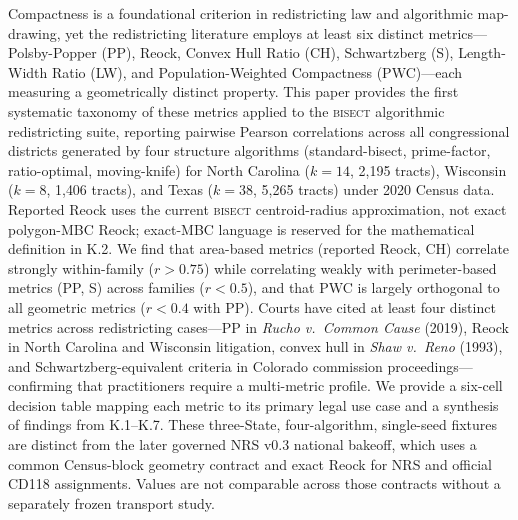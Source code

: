 Compactness is a foundational criterion in redistricting law and algorithmic map-drawing,
yet the redistricting literature employs at least six distinct metrics---Polsby-Popper (PP),
Reock, Convex Hull Ratio (CH), Schwartzberg (S), Length-Width Ratio (LW), and
Population-Weighted Compactness (PWC)---each measuring a geometrically distinct
property. This paper provides the first systematic taxonomy of these metrics
applied to the \textsc{bisect} algorithmic redistricting suite, reporting
pairwise Pearson correlations across all congressional districts generated by four
structure algorithms (standard-bisect, prime-factor, ratio-optimal, moving-knife)
for North Carolina ($k=14$, 2{,}195 tracts), Wisconsin ($k=8$, 1{,}406 tracts),
and Texas ($k=38$, 5{,}265 tracts) under 2020 Census data.
Reported Reock uses the current \textsc{bisect} centroid-radius approximation,
not exact polygon-MBC Reock; exact-MBC language is reserved for the mathematical
definition in K.2.
We find that area-based metrics (reported Reock, CH) correlate strongly within-family
($r > 0.75$) while correlating weakly with perimeter-based metrics (PP, S)
across families ($r < 0.5$), and that PWC is largely orthogonal to all
geometric metrics ($r < 0.4$ with PP).
Courts have cited at least four distinct metrics across redistricting cases---PP
in \textit{Rucho v.\ Common Cause} (2019), Reock in North Carolina and Wisconsin
litigation, convex hull in \textit{Shaw v.\ Reno} (1993), and Schwartzberg-equivalent
criteria in Colorado commission proceedings---confirming that practitioners
require a multi-metric profile.
We provide a six-cell decision table mapping each metric to its primary legal
use case and a synthesis of findings from K.1--K.7. These three-State,
four-algorithm, single-seed fixtures are distinct from the later governed NRS
v0.3 national bakeoff, which uses a common Census-block geometry contract and
exact Reock for NRS and official CD118 assignments. Values are not comparable
across those contracts without a separately frozen transport study.
